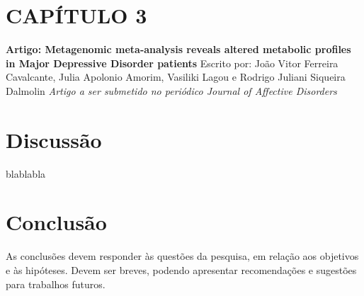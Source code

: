 \documentclass[
	12pt,				%
	oneside,			%
	a4paper,			%
	chapter=TITLE,		%
	section=TITLE,		%
	english,			%
	brazil				%
	]{abntex2}
\begin{document}
\chapter*{CAPÍTULO 3}\label{cap3}
\begin{center}
\textbf{Artigo: Metagenomic meta-analysis reveals altered metabolic profiles in Major Depressive Disorder patients}
\bigskip\newline
Escrito por: João Vitor Ferreira Cavalcante, Julia Apolonio Amorim, Vasiliki Lagou e Rodrigo Juliani Siqueira Dalmolin
\bigskip\newline
\textit{Artigo a ser submetido no periódico Journal of Affective Disorders}

\end{center}
\chapter{Discussão}\label{disc}

blablabla

\chapter{Conclusão}\label{conclusuxe3o}

As conclusões devem responder às questões da pesquisa, em relação aos objetivos
e às hipóteses. Devem ser breves, podendo apresentar recomendações e sugestões
para trabalhos futuros.

\postextual

\begingroup

\printbibliography[title=REFERÊNCIAS]

\endgroup


%
%

\end{document}
